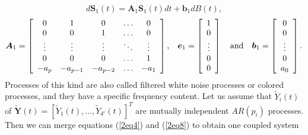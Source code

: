 \documentclass[preprint,12pt,authoryear]{elsarticle}
\newcommand{\bs}[1]{{\boldsymbol{#1}}}
\begin{document}
\begin{equation}
d\bs{S}_1(t)=\bs{A}_1\bs{S}_1(t)dt+\bs{b}_1dB(t),
\label{2eq8}
\end{equation}
\begin{equation*}
\bs{A}_1=\left[\begin{array}{c c c c c}
0 & 1 & 0 & \ldots & 0 \\
0 & 0 & 1 & \ldots & 0 \\
\vdots & \vdots & \vdots & \ddots & \vdots \\
0 & 0 & 0 & \ldots & 1 \\
-a_p & -a_{p-1} & -a_{p-2} & \ldots & -a_1
\end{array}\right]
\mbox{,}\quad
\bs{e}_1=\left[\begin{array}{c}
1 \\ 0 \\ \vdots \\ 0 \\ 0
\end{array}\right]
\quad\mbox{and}\quad
\bs{b}_1=\left[\begin{array}{c}
0 \\ 0 \\ \vdots \\ 0 \\ a_0
\end{array}\right].
\end{equation*}
Processes of this kind are also called filtered white noise processes or colored processes, and they have a specific frequency content. Let us assume that $\tilde{Y}_i(t)$ of  $\bs{\tilde{Y}}(t)=[\tilde{Y}_1(t),\ldots,\tilde{Y}_{d'}(t)]^T$ are mutually independent $AR(p_i)$ processes. Then we can merge equations (\ref{2eq4}) and (\ref{2eq8}) to obtain one coupled system
\end{document}
